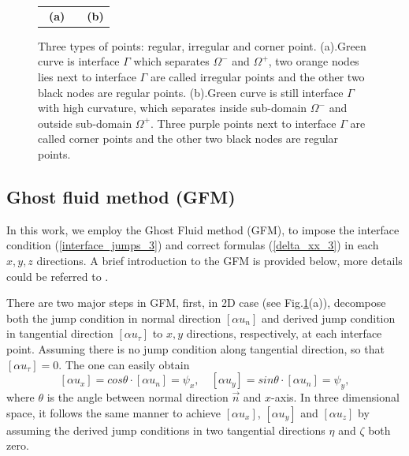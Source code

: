 \documentclass[dissertation]{uathesis}
\begin{document}
\begin{body}
\begin{flushleft}
\begin{figure}[!ht]
\begin{center}
{\begin{tabular}{ccc}
				\ \textbf{(a)} & \quad & \textbf{(b)}
		\end{tabular}}
	\end{center}
	\caption{Three types of points: regular, irregular and corner point. 
		(a).Green curve is interface $\Gamma$ which separates $\Omega^{-}$ and $\Omega^{+}$, two orange nodes lies next to interface $\Gamma$ are called irregular points and the other two black nodes are regular points.
		(b).Green curve is still interface $\Gamma$ with high curvature, which separates inside sub-domain $\Omega^{-}$ and outside sub-domain $\Omega^{+}$. Three purple points next to interface $\Gamma$ are called corner points and the other two black nodes are regular points. }
	\label{fig:irregular and corner points_3}
\end{figure}
%
\subsection{Ghost fluid method (GFM)}
\hspace{1cm} In this work, we employ the Ghost Fluid method (GFM), to impose the interface condition (\ref{interface_jumps_3}) and correct formulas (\ref{delta_xx_3}) in each $x, y, z$ directions. A brief introduction to the GFM is provided below, more details could be referred to \cite{fedkiw1999non}. 

\hspace{1cm} There are two major steps in GFM, first, in 2D case (see Fig.\ref{fig:irregular and corner points_3}(a)), decompose both the jump condition in normal direction $[\alpha u_n]$ and derived jump condition in tangential direction $[\alpha u_\tau]$ to $x, y$ directions, respectively, at each interface point. Assuming there is no jump condition along tangential direction, so that $[\alpha u_\tau] = 0$. The one can easily obtain  
%
\begin{equation}\label{GFM_jump_3}
[\alpha u_x] = cos\theta \cdot [\alpha u_n] = \psi_x, \quad [\alpha u_y] = sin\theta \cdot [\alpha u_n] = \psi_y, 
\end{equation}
%
where $\theta$ is the angle between normal direction $\vec{n}$ and $x$-axis. In three dimensional space, it follows the same manner to achieve $[\alpha u_x]$, $[\alpha u_y]$ and $[\alpha u_z]$ by assuming the derived jump conditions in two tangential directions $\eta$ and $\zeta$ both zero.


\end{flushleft}
\end{body}
\end{document}
